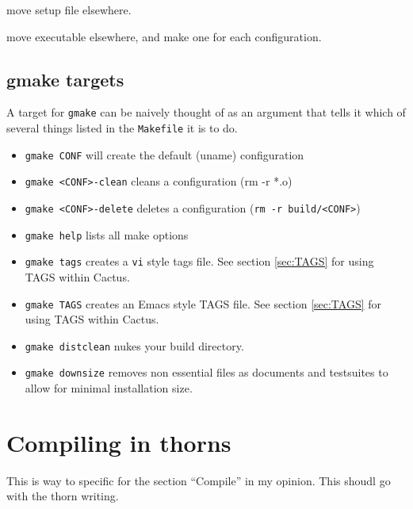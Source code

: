 {\q move setup file elsewhere.}

{\q move executable elsewhere, and make one for each configuration.}

\subsection{gmake targets}

A target for {\tt gmake} can be naively thought of as an argument
that tells it which of several things listed in the {\tt Makefile} it
is to do.

\begin{itemize}

\item {\tt gmake CONF} will create the default (uname) configuration

\item {\tt gmake <CONF>-clean} cleans a configuration (rm -r *.o)

\item {\tt gmake <CONF>-delete} deletes a configuration ({\tt rm -r build/<CONF>})

\item {\tt gmake help} lists all make options

\item {\tt gmake tags} creates a {\tt vi} style tags file. See section
  \ref{sec:TAGS} for using TAGS within Cactus.

\item {\tt gmake TAGS} creates an Emacs style TAGS file. See section
  \ref{sec:TAGS} for using TAGS within Cactus.

\item {\tt gmake distclean} nukes your build directory.

\item {\tt gmake downsize} removes non essential files as documents
  and testsuites to allow for minimal installation size.

\end{itemize}


\section{Compiling in thorns}

{\q This is way to specific for the section ``Compile'' in my opinion.
This shoudl go with the thorn writing.}

